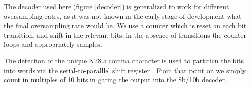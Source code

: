 The decoder used here (figure \ref{decoder}) is generalized to work
for different oversampling rates, as it was not known in the early
stage of development what the final oversampling rate would be. We use
a counter which is reset on each bit transition, and shift in the
relevant bits; in the absence of transitions the counter loops and
appropriately samples.

The detection of the unique K28.5 comma character is used to partition
the bits into words via the serial-to-paralllel shift register
. From that point on we simply count in multiples of
10 bits in gating the output into the 8b/10b decoder.



